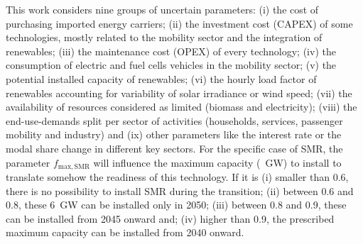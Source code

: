 This work considers nine groups of uncertain parameters: (i) the cost of purchasing imported energy carriers; (ii) the investment cost (\ie CAPEX) of some technologies, mostly related to the mobility sector and the integration of renewables; (iii) the maintenance cost (\ie OPEX) of every technology; (iv) the consumption of electric and fuel cells vehicles in the mobility sector; (v) the potential installed capacity of renewables; (vi) the hourly load factor of renewables accounting for variability of solar irradiance or wind speed; (vii) the availability of resources considered as limited (\ie biomass and electricity); (viii) the end-use-demands split per sector of activities (\ie households, services, passenger mobility and industry) and (ix) other parameters like the interest rate or the modal share change in different key sectors. For the specific case of \gls{SMR}, the parameter $f_{\mathrm{max,SMR}}$ will influence the maximum capacity (~GW) to install to translate somehow the readiness of this technology. If it is (i) smaller than 0.6, there is no possibility to install \gls{SMR} during the transition; (ii) between 0.6 and 0.8, these 6~GW can be installed only in 2050; (iii) between 0.8 and 0.9, these can be installed from 2045 onward and; (iv) higher than 0.9, the prescribed maximum capacity can be installed from 2040 onward. 



